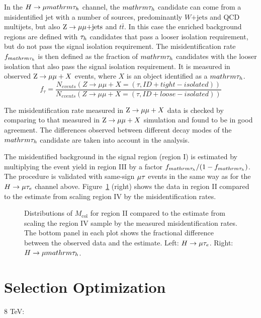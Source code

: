 \documentclass[oneside, letterpaper, oldfontcommands]{memoir}
\begin{document}
{{{In the $H \rightarrow \mu mathrm{\tau_{h}}$ channel, the $mathrm{\tau_{h}}$ candidate can come from a  misidentified
jet with a number of sources, predominantly  $W\mathrm{+jets}$ and QCD multijets,
but also $\mathrm{Z} \rightarrow \mu \mu\text{+jets}$ and $t\bar{t}$. In this case the enriched background
regions are defined with $\mathrm{\tau}_h$ candidates that pass a looser isolation requirement, but do not pass the
signal isolation requirement. The misidentification rate $f_{mathrm{\tau_{h}}}$ is then defined as the fraction of $mathrm{\tau_{h}}$ candidates with
the looser isolation that also pass the signal isolation requirement. It is measured in
observed  $\mathrm{Z} \rightarrow \mu \mu +X$ events, where $X$ is
an object identified as a $mathrm{\tau_{h}}$.
\begin{equation}
f_{\tau}= \frac{N_{events}(Z \rightarrow \mu \mu +X=(\tau, ID+tight-isolated))}
               {N_{events}(Z \rightarrow \mu \mu +X=(\tau, ID+loose-isolated))}
\end{equation}

The misidentification rate  measured in  $\mathrm{Z} \rightarrow \mu \mu  +X$ data is checked by comparing to that
measured in $\mathrm{Z} \rightarrow \mu \mu +X$ simulation and found to be in good agreement.
The differences observed between different decay modes of the  $mathrm{\tau_{h}}$ candidate are taken
into account in the analysis.

The misidentified background in the signal region (region I) is estimated by multiplying
the event yield in region III by a factor $f_{mathrm{\tau_{h}}}/(1-f_{mathrm{\tau_{h}}})$.
The procedure is validated with same-sign $\mu\mathrm{\tau}$ events in the same way as
for the $H \rightarrow \mu \mathrm{\tau}_{e}$ channel above. Figure~\ref{fig:samesign_fakes} (right) shows
the data  in region II compared to the estimate from scaling
region IV by the misidentification rates.


\begin{figure}[hbtp]\centering
\caption{Distributions of $M_\text{col}$ for region II compared to the estimate
from scaling the region IV sample by the measured misidentification rates. The bottom panel in each plot shows the fractional difference between the observed data and the estimate. Left:  $H \rightarrow \mu \mathrm{\tau}_{e}$. Right: $H \rightarrow \mu mathrm{\tau_{h}}$. }
\label{fig:samesign_fakes}\end{figure}


\section{Selection Optimization}
8 TeV:

}}}
\end{document}
